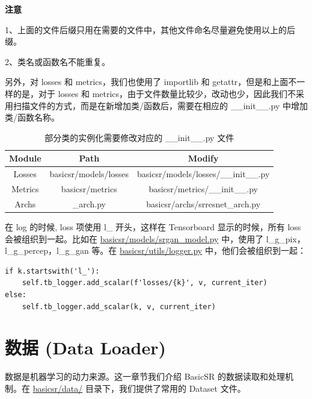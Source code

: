 \documentclass[../main.tex]{subfiles}
\begin{document}
\begin{hl} %
\textbf{注意}

1、上面的文件后缀只用在需要的文件中，其他文件命名尽量避免使用以上的后缀。

2、类名或函数名不能重复。
\end{hl}

另外，对 losses 和 metrics，我们也使用了 importlib 和 getattr，但是和上面不一样的是，对于 losses 和 metrics，由于文件数量比较少，改动也少，因此我们不采用扫描文件的方式，而是在新增加类/函数后，需要在相应的 \_\_init\_\_.py 中增加类/函数名称。
\begin{table}[h]
\centering
\begin{tabular}{|c|c|c|}
\hline
\textbf{Module} & \textbf{Path} & \textbf{Modify} \\ \hline
Losses & basicsr/models/losses & basicsr/models/losses/\_\_init\_\_.py \\ \hline
Metrics & basicsr/metrics & basicsr/metrics/\_\_init\_\_.py \\ \hline
Archs & \_arch.py & basicsr/archs/srresnet\_arch.py \\ \hline
\end{tabular}
\caption{部分类的实例化需要修改对应的 \_\_init\_\_.py 文件}
\end{table}

在 log 的时候, loss 项使用 l\_ 开头，这样在 Tensorboard 显示的时候，所有 loss 会被组织到一起。比如在 \href{https://github.com/XPixelGroup/BasicSR/blob/master/basicsr/models/srgan_model.py}{basicsr/models/srgan\_model.py} 中，使用了 l\_g\_pix，l\_g\_percep，l\_g\_gan 等。在 \href{https://github.com/XPixelGroup/BasicSR/blob/master/basicsr/utils/logger.py}{basicsr/utils/logger.py} 中，他们会被组织到一起：
\begin{verbatim}
if k.startswith('l_'):
    self.tb_logger.add_scalar(f'losses/{k}', v, current_iter)
else:
    self.tb_logger.add_scalar(k, v, current_iter)
\end{verbatim}






\section{数据 (Data Loader)}\label{code_structure:data}
    数据是机器学习的动力来源。这一章节我们介绍 BasicSR 的数据读取和处理机制。在 \href{https://github.com/XPixelGroup/BasicSR/tree/master/basicsr/data}{basicsr/data/} 目录下，我们提供了常用的 Dataset 文件。
\end{document}
